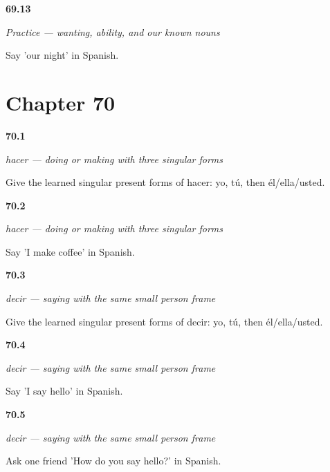 \noindent\begin{minipage}[t]{\linewidth}
\raggedright
\hypertarget{review-ES-C11-practice-our-night}{\textbf{69.13}} \emph{Practice — wanting, ability, and our known nouns}\par
\small Say 'our night' in Spanish.
\end{minipage}\par\medskip

\section*{Chapter 70}

\noindent\begin{minipage}[t]{\linewidth}
\raggedright
\hypertarget{review-ES-C12-hacer-singular-forms}{\textbf{70.1}} \emph{hacer — doing or making with three singular forms}\par
\small Give the learned singular present forms of hacer: yo, tú, then él/ella/usted.
\end{minipage}\par\medskip

\noindent\begin{minipage}[t]{\linewidth}
\raggedright
\hypertarget{review-ES-C12-hacer-make-coffee}{\textbf{70.2}} \emph{hacer — doing or making with three singular forms}\par
\small Say 'I make coffee' in Spanish.
\end{minipage}\par\medskip

\noindent\begin{minipage}[t]{\linewidth}
\raggedright
\hypertarget{review-ES-C12-decir-singular-forms}{\textbf{70.3}} \emph{decir — saying with the same small person frame}\par
\small Give the learned singular present forms of decir: yo, tú, then él/ella/usted.
\end{minipage}\par\medskip

\noindent\begin{minipage}[t]{\linewidth}
\raggedright
\hypertarget{review-ES-C12-decir-say-hello}{\textbf{70.4}} \emph{decir — saying with the same small person frame}\par
\small Say 'I say hello' in Spanish.
\end{minipage}\par\medskip

\noindent\begin{minipage}[t]{\linewidth}
\raggedright
\hypertarget{review-ES-C12-decir-how-do-you-say}{\textbf{70.5}} \emph{decir — saying with the same small person frame}\par
\small Ask one friend 'How do you say hello?' in Spanish.
\end{minipage}\par\medskip

